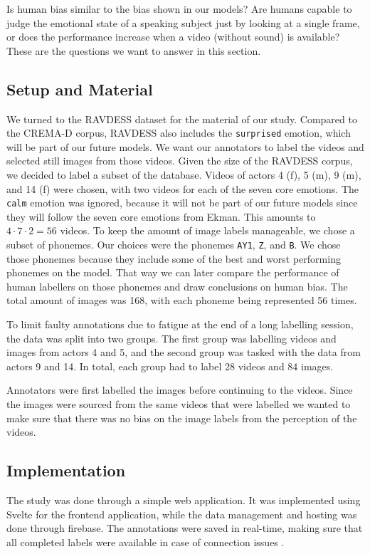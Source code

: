 Is human bias similar to the bias shown in our models? Are humans capable to judge the emotional state of a speaking subject just by looking at a single frame, or does the performance increase when a video (without sound) is available? These are the questions we want to answer in this section.

\subsection{Setup and Material}
We turned to the RAVDESS dataset \cite{livingstone2018ryerson} for the material of our study. Compared to the CREMA-D corpus, RAVDESS also includes the \texttt{surprised} emotion, which will be part of our future models. We want our annotators to label the videos and selected still images from those videos. Given the size of the RAVDESS corpus, we decided to label a subset of the database. Videos of actors 4 (f), 5 (m), 9 (m), and 14 (f) were chosen, with two videos for each of the seven core emotions. The \texttt{calm} emotion was ignored, because it will not be part of our future models since they will follow the seven core emotions from Ekman. This amounts to $4 \cdot 7 \cdot 2 = 56$ videos. To keep the amount of image labels manageable, we chose a subset of phonemes. Our choices were the phonemes \texttt{AY1}, \texttt{Z}, and \texttt{B}. We chose those phonemes because they include some of the best and worst performing phonemes on the model. That way we can later compare the performance of human labellers on those phonemes and draw conclusions on human bias. The total amount of images was 168, with each phoneme being represented 56 times.

To limit faulty annotations due to fatigue at the end of a long labelling session, the data was split into two groups. The first group was labelling videos and images from actors 4 and 5, and the second group was tasked with the data from actors 9 and 14. In total, each group had to label 28 videos and 84 images.

Annotators were first labelled the images before continuing to the videos. Since the images were sourced from the same videos that were labelled we wanted to make sure that there was no bias on the image labels from the perception of the videos.

\subsection{Implementation}
The study was done through a simple web application. It was implemented using Svelte for the frontend application, while the data management and hosting was done through firebase. The annotations were saved in real-time, making sure that all completed labels were available in case of connection issues \cite{baur2021}.

